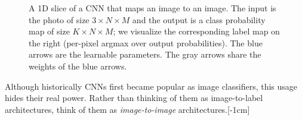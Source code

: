 \begin{figure}
{
    }
    \caption{A 1D slice of a CNN that maps an image to an image. The input is the photo of size $3 \times N \times M$ and the output is a class probability map of size $K \times N \times M$; we visualize the corresponding label map on the right (per-pixel argmax over output probabilities). The blue arrows are the learnable parameters. The gray arrows share the weights of the blue arrows.}
    \label{fig:convolutional_neural_networks:image_to_image_arch}
\end{figure}

Although historically CNNs first became popular as image classifiers, this usage hides their real power. Rather than thinking of them as image-to-label architectures, think of them as \textit{image-to-image} architectures.[-1cm] %

